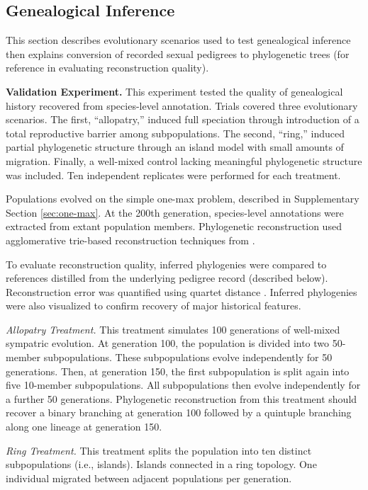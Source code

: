 \subsection{Genealogical Inference}
\label{sec:genealogical-inference}

This section describes evolutionary scenarios used to test genealogical inference then explains conversion of recorded sexual pedigrees to phylogenetic trees (for reference in evaluating reconstruction quality).

\textbf{Validation Experiment.}
This experiment tested the quality of genealogical history recovered from species-level  annotation.
Trials covered three evolutionary scenarios.
The first, ``allopatry,'' induced full speciation through introduction of a total reproductive barrier among subpopulations.
The second, ``ring,'' induced partial phylogenetic structure through an island model with small amounts of migration.
Finally, a well-mixed control lacking meaningful phylogenetic structure was included.
Ten independent replicates were performed for each treatment.

Populations evolved on the simple one-max problem, described in Supplementary Section \ref{sec:one-max}.
At the 200th generation, species-level annotations were extracted from extant population members.
Phylogenetic reconstruction used agglomerative trie-based reconstruction techniques from \citep{moreno2023toward}.

To evaluate reconstruction quality, inferred phylogenies were compared to references distilled from the underlying pedigree record (described below).
Reconstruction error was quantified using quartet distance \citep{estabrook1985comparison,sand2014tqdist}.
Inferred phylogenies were also visualized to confirm recovery of major historical features.

\textit{Allopatry Treatment.}
This treatment simulates 100 generations of well-mixed sympatric evolution.
At generation 100, the population is divided into two 50-member subpopulations.
These subpopulations evolve independently for 50 generations.
Then, at generation 150, the first subpopulation is split again into five 10-member subpopulations.
All subpopulations then evolve independently for a further 50 generations.
Phylogenetic reconstruction from this treatment should recover a binary branching at generation 100 followed by a quintuple branching along one lineage at generation 150.

\textit{Ring Treatment.}
This treatment splits the population into ten distinct subpopulations (i.e., islands).
Islands connected in a ring topology.
One individual migrated between adjacent populations per generation.

